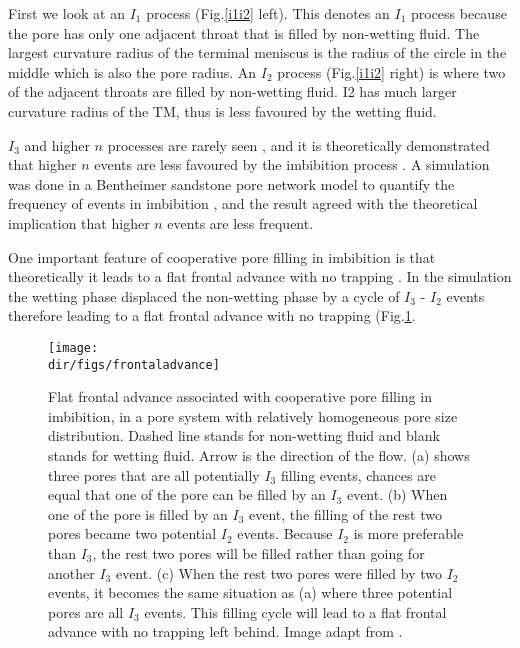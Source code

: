 First we look at an $I_1$ process (Fig.\ref{i1i2} left). This denotes an $I_1$ process because the pore has only one adjacent throat that is filled by non-wetting fluid. The largest curvature radius of the terminal meniscus is the radius of the circle in the middle which is also the pore radius. An $I_2$ process (Fig.\ref{i1i2} right) is where two of the adjacent throats are filled by non-wetting fluid. I2 has much larger curvature radius of the TM, thus is less favoured by the wetting fluid. 

$I_3$ and higher $n$ processes are rarely seen \citep{blunt2017multiphase}, and it is theoretically demonstrated that higher $n$ events are less favoured by the imbibition process \citep{blunt1998physically,oren1998extending}. A simulation was done in a Bentheimer sandstone pore network model to quantify the frequency of events in imbibition \citep{blunt2017multiphase}, and the result agreed with the theoretical implication that higher $n$ events are less frequent.

One important feature of cooperative pore filling in imbibition is that theoretically it leads to a flat frontal advance with no trapping \citep{blunt1992simulation}. In the simulation the wetting phase displaced the non-wetting phase by a cycle of $I_3$ - $I_2$ events therefore leading to a flat frontal advance with no trapping (Fig.\ref{frontadvance}.

\begin{figure}[htbp]
  \centering
  \texttt{[image: \\dir/figs/frontaladvance]}
  \caption{Flat frontal advance associated with cooperative pore filling in imbibition, in a pore system with relatively homogeneous pore size distribution. Dashed line stands for non-wetting fluid and blank stands for wetting fluid. Arrow is the direction of the flow. (a) shows three pores that are all potentially $I_3$ filling events, chances are equal that one of the pore can be filled by an $I_3$ event. (b) When one of the pore is filled by an $I_3$ event, the filling of the rest two pores became two potential $I_2$ events. Because $I_2$ is more preferable than $I_3$, the rest two pores will be filled rather than going for another $I_3$ event. (c) When the rest two pores were filled by two $I_2$ events, it becomes the same situation as (a) where three potential pores are all $I_3$ events. This filling cycle will lead to a flat frontal advance with no trapping left behind. Image adapt from \citet{blunt1992simulation}.}
  \label{frontadvance}
\end{figure}


